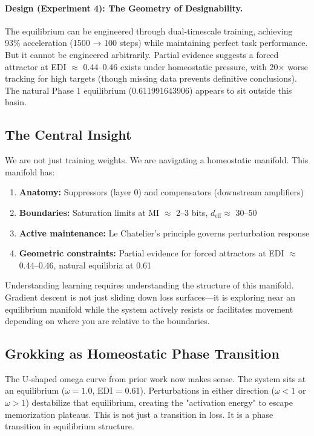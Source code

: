 \paragraph{Design (Experiment 4): The Geometry of Designability.}
The equilibrium can be engineered through dual-timescale training, achieving 93\% acceleration (1500 → 100 steps) while maintaining perfect task performance. But it cannot be engineered arbitrarily. Partial evidence suggests a forced attractor at EDI $\approx$ 0.44--0.46 exists under homeostatic pressure, with 20× worse tracking for high targets (though missing data prevents definitive conclusions). The natural Phase 1 equilibrium (0.611991643906) appears to sit outside this basin.

\subsection{The Central Insight}

We are not just training weights. We are navigating a homeostatic manifold. This manifold has:
\begin{enumerate}
\item \textbf{Anatomy:} Suppressors (layer 0) and compensators (downstream amplifiers)
\item \textbf{Boundaries:} Saturation limits at MI $\approx$ 2--3 bits, $d_{\text{eff}} \approx$ 30--50
\item \textbf{Active maintenance:} Le Chatelier's principle governs perturbation response
\item \textbf{Geometric constraints:} Partial evidence for forced attractors at EDI $\approx$ 0.44--0.46, natural equilibria at 0.61
\end{enumerate}

Understanding learning requires understanding the structure of this manifold. Gradient descent is not just sliding down loss surfaces—it is exploring near an equilibrium manifold while the system actively resists or facilitates movement depending on where you are relative to the boundaries.

\subsection{Grokking as Homeostatic Phase Transition}

The U-shaped omega curve from prior work now makes sense. The system sits at an equilibrium ($\omega = 1.0$, EDI = 0.61). Perturbations in either direction ($\omega < 1$ or $\omega > 1$) destabilize that equilibrium, creating the "activation energy" to escape memorization plateaus. This is not just a transition in loss. It is a phase transition in equilibrium structure.

